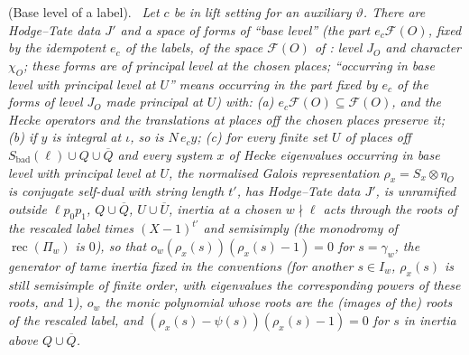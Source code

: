 \documentclass[10pt]{amsart}
\theoremstyle{definition}
\theoremstyle{remark}
\providecommand{\pgS}{S_{\mathrm{bad}}}
\newenvironment{quotedthm}[2]{\par\medskip\noindent\begingroup
  \textbf{#1}#2.\ \itshape\ignorespaces}{\endgroup\par\medskip}
\begin{document}
\begin{quotedthm}{\cite[Proposition~4.6]{P55}}{ (Base level of a label)}
Let $c$ be in lift setting for an auxiliary $\vartheta$. There are Hodge--Tate data $J'$ and a
space of forms of ``base level'' (the part $e_c\mathcal F(O)$, fixed by the idempotent $e_c$ of the labels, of the space $\mathcal F(O)$ of {\cite[Definition~8.42]{P55}}: level
$J_O$ and character $\chi_O$; these forms are of principal level at the chosen places; ``occurring in base level with principal level at $U$'' means occurring in the part fixed by $e_c$ of the forms of level $J_O$ made principal at $U$) with: (a) $e_c\mathcal F(O)\subseteq\mathcal F(O)$, and the Hecke operators and the translations at places off the chosen places preserve it; (b) if
$y$ is integral at $\iota$, so is $N\,e_cy$; (c) for every finite set $U$ of places off
$\pgS(\ell)\cup Q\cup\overline Q$ and every system $x$ of Hecke eigenvalues occurring in base level
with principal level at $U$, the normalised Galois representation $\rho_x=S_x\otimes\eta_O$ is
conjugate self-dual with string length $t'$, has Hodge--Tate data $J'$, is unramified outside $\ell
p_0p_1$, $Q\cup\overline Q$, $U\cup\overline U$, inertia at a chosen $w\nmid\ell$ acts through the roots of
the rescaled label times $(X-1)^{t'}$ and semisimply (the monodromy of $\operatorname{rec}(\Pi_w)$
is $0$), so that $o_w(\rho_x(s))(\rho_x(s)-1)=0$ for $s=\gamma_w$, the generator of tame inertia fixed in the conventions (for another $s\in I_w$, $\rho_x(s)$ is still semisimple of finite order, with eigenvalues the corresponding powers of these roots, and $1$), $o_w$ the monic polynomial whose
roots are the (images of the) roots of the rescaled label, and $(\rho_x(s)-\psi(s))(\rho_x(s)-1)=0$
for $s$ in inertia above $Q\cup\overline Q$.
\end{quotedthm}
\end{document}
